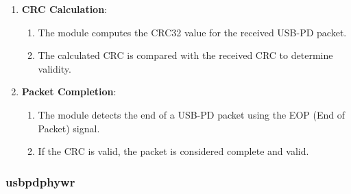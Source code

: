 \begin{enumerate}
    \item \textbf{CRC Calculation}:
    \begin{enumerate}
        \item The module computes the CRC32 value for the received USB-PD packet.
    \item The calculated CRC is compared with the received CRC to determine validity. 
    \end{enumerate}
    \item \textbf{Packet Completion}:
        \begin{enumerate}
            \item The module detects the end of a USB-PD packet using the EOP (End of Packet) signal.
            \item If the CRC is valid, the packet is considered complete and valid. 
        \end{enumerate}
    
\end{enumerate}
\subsubsection{usb\textunderscore pd\textunderscore phy\textunderscore wr}

